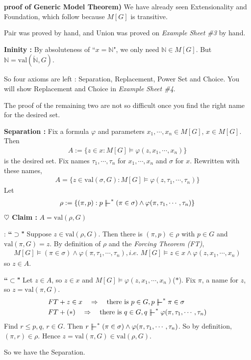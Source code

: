 \documentclass[12pt,a4paper]{article}
\newenvironment{proof}
{\begin{changemargin}{0.5cm}{0.5cm} 
	}%
	{\end{changemargin}
}
\newenvironment{subproof}
{\begin{changemargin}{0.5cm}{0.5cm} 
	}%
	{\end{changemargin}
}
\newenvironment{p}
{\begin{proof} 
	}%
	{\end{proof}
}
\begin{document}
\begin{p}
\textbf{proof of Generic Model Theorem)} We have already seen Extensionality and Foundation, which follow because $M[G]$ is transitive.

\quad Pair was proved by hand, and Union was proved on \emph{Example Sheet \#3} by hand.
\s

\textbf{Ininity :} By absoluteness of ``$x=\mathbb{N}$", we only need $\mathbb{N} \in M[G]$. But $\mathbb{N} = \text{val} (\check{\mathbb{N}}, G)$.

\quad So four axioms are left : Separation, Replacement, Power Set and Choice. You will show Replacement and Choice in \emph{Example Sheet \#4}.

\quad The proof of the remaining two are not so difficult once you find the right name for the desired set.
\s

\textbf{Separation :} Fix a formula $\varphi$ and parameters $x_1, \cdots, x_n \in M[G]$, $x\in M[G]$. Then
\begin{align*}
A:= \{ z\in x : M[G] \models \varphi(z, x_1, \cdots, x_n)\}
\end{align*}
is the desired set. Fix names $\tau_1, \cdots, \tau_n$ for $x_1, \cdots, x_n$ and $\sigma$ for $x$. Rewritten with these names,
\begin{align*}
A =\{z\in \text{val}(\sigma, G) : M[G] \models \varphi(z, \tau_1, \cdots, \tau_n ) \}
\end{align*}
Let
\begin{align*}
\rho := \{(\pi, p): p\forces^* (\pi \in \sigma) \wedge \varphi(\pi, \tau_1, \cdots, \tau_n)\}
\end{align*}
\textbf{$\heartsuit$ Claim :} $A= \text{val}(\rho, G)$
\begin{subproof}
: \textbf{``$\supset$"} Suppose $z\in \text{val}(\rho, G)$. Then there is $(\pi, p) \in \rho$ with $p\in G$ and $\text{val}(\pi, G) =z$. By definition of $\rho$ and the \emph{Forcing Theorem (FT)}, 
\begin{align*}
M[G] \models (\pi \in \sigma) \wedge \varphi(\pi, \tau_1, \cdots, \tau_n), \textit{i.e. } M[G] \models z\in x \wedge \varphi(z, x_1, \cdots, x_n) 
\end{align*}
so $z\in A$.

\textbf{``$\subset$"} Let $z\in A$, so $z\in x$ and $M[G] \models \varphi(z, x_1, \cdots, x_n)$($*$). Fix $\pi$, a name for $z$, so $z= \text{val}(\pi, G)$.
\begin{align*}
& FT + z\in x \quad  \Rightarrow \quad \text{there is } p\in G, p\forces^* \pi \in \sigma\\
& FT + (*) \quad \Rightarrow \quad \text{there is } q\in G, q\forces^* \varphi(\pi, \tau_1, \cdots, \tau_n)
\end{align*}
Find $r\leq p, q$, $r\in G$. Then $r\forces^* (\pi \in \sigma) \wedge \varphi(\pi, \tau_1, \cdots, \tau_n)$. So by definition, $(\pi, r) \in \rho$. Hence $z= \text{val}(\pi, G) \in \text{val}(\rho, G)$.
\end{subproof}
So we have the Separation.
\s


\end{p}
\end{document}
